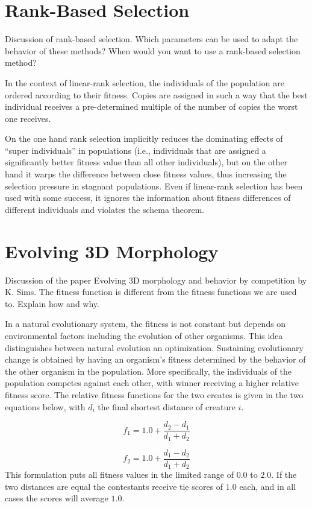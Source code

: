 \documentclass[../main.tex]{subfiles}
\begin{document}
\section{Rank-Based Selection}
\begin{question}
Discussion of rank-based selection. Which parameters can be used to adapt the behavior of these methods? When would you
want to use a rank-based selection method?
\end{question}
\begin{solution}
In the context of linear-rank selection, the individuals of the population are ordered according to their fitness.
Copies are assigned in such a way that the best individual receives a pre-determined multiple of the number of copies
the worst one receives.

On the one hand rank selection implicitly reduces the dominating effects of ``super
individuals'' in populations (i.e., individuals that are assigned a significantly better fitness value than all other
individuals), but on the other hand it warps the difference between close fitness values, thus increasing the selection
pressure in stagnant populations. Even if linear-rank selection has been used with some success, it ignores the
information about fitness differences of different individuals and violates the schema theorem.
\end{solution}

\section{Evolving 3D Morphology}
\begin{question}
Discussion of the paper Evolving 3D morphology and behavior by competition by K. Sims. The fitness function is
different from the fitness functions we are used to. Explain how and why.
\end{question}
\begin{solution}
In a natural evolutionary system, the fitness is not constant but depends on environmental factors including the
evolution of other organisms. This idea distinguishes between natural evolution an optimization. Sustaining
evolutionary change is obtained by having an organism's fitness determined by the behavior of the other organism in the
population. More specifically, the individuals of the population competes against each other, with winner receiving a
higher relative fitness score. The relative fitness functions for the two creates is given in the two equations below, with $d_i$ the final shortest distance of creature $i$.

\begin{equation}
    f_1 = 1.0 + \frac{d_2-d_1}{d_1 + d_2}
\end{equation}

\begin{equation}
    f_2 = 1.0 + \frac{d_1-d_2}{d_1 + d_2}
\end{equation}
This formulation puts all fitness values in the limited range of $0.0$ to $2.0$. If the two distances are equal the
contestants receive tie scores of $1.0$ each, and in all cases the scores will average $1.0$.
\end{solution}
\end{document}

